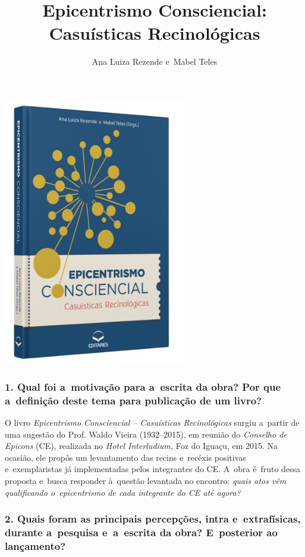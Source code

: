 \documentclass{gescons}
\author{Ana Luiza Rezende e~Mabel Teles}
\title{Epicentrismo Consciencial: Casuísticas Recinológicas}
\begin{document}
    \makeentrevistatitle

    \begin{multicols}{2}


\begin{center}
    \includegraphics[width=8cm]{articles/entrevista/mockups/Mabel-e-Ana-Luiza.png}
\end{center}

\subsubsection{1. Qual foi a~motivação para a~escrita da obra? Por que a~definição deste tema para publicação de um livro?}


O livro \textit{Epicentrismo Consciencial – Casuísticas Recinológicas} surgiu a~partir de uma sugestão do Prof. Waldo Vieira (1932--2015), em reunião do \textit{Conselho de Epicons} (CE), realizada no \textit{Hotel Interludium,} Foz do Iguaçu, em 2015. Na ocasião, ele propôs um levantamento das recins e~recéxis positivas e~exemplaristas já implementadas pelos integrantes do CE. A~obra é~fruto dessa proposta e~busca responder à~questão levantada no encontro: \textit{quais atos vêm qualificando o~epicentrismo de cada integrante do CE até agora? }

\subsubsection{2. Quais foram as principais percepções, intra e~extrafísicas, durante a~pesquisa e~a~escrita da obra? E~posterior ao lançamento?}


\end{multicols}
\end{document}
